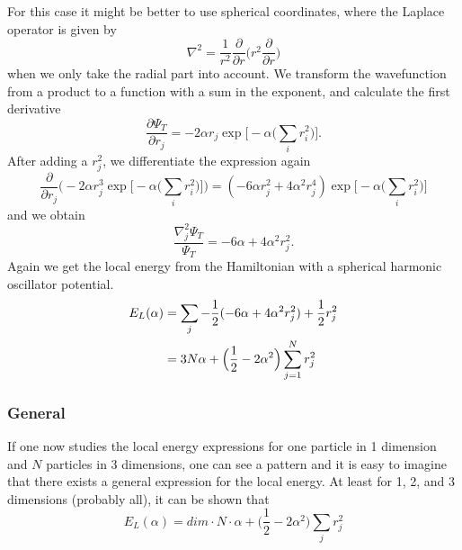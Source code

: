 \documentclass[norsk,a4paper,12pt]{article}
\begin{document}
For this case it might be better to use spherical coordinates, where the Laplace operator is given by
\begin{equation}
\nabla^2=\frac{1}{r^2}\frac{\partial}{\partial r}\bigg(r^2\frac{\partial}{\partial r}\bigg)
\end{equation}
when we only take the radial part into account. We transform the wavefunction from a product to a function with a sum in the exponent, and calculate the first derivative
\begin{equation}
\frac{\partial\Psi_T}{\partial r_j}=-2\alpha r_j \exp\bigg[-\alpha\bigg(\sum_i r_i^2\bigg)\bigg].
\end{equation}
After adding a $r_j^2$, we differentiate the expression again
\begin{equation*}
\frac{\partial}{\partial r_j}\bigg(-2\alpha r_j^3\exp\Big[-\alpha\Big(\sum_i r_i^2\Big)\Big]\bigg)
=(-6\alpha r_j^2 + 4\alpha^2r_j^4)\exp\Big[-\alpha\Big(\sum_i r_i^2\Big)\Big]
\end{equation*}
and we obtain
\begin{equation}
\frac{\nabla_j^2\Psi_T}{\Psi_T}=-6\alpha+4\alpha^2r_j^2.
\end{equation}
Again we get the local energy from the Hamiltonian with a spherical harmonic oscillator potential. 
\begin{align}
E_L(\alpha)&=\sum_j-\frac{1}{2}(-6\alpha+4\alpha^2r_j^2) + \frac{1}{2}r_j^2\notag\\
&=3N\alpha + \Big(\frac{1}{2}-2\alpha^2\Big)\sum_{j=1}^Nr_j^2
\end{align}

\subsubsection{General}
If one now studies the local energy expressions for one particle in 1 dimension and $N$ particles in 3 dimensions, one can see a pattern and it is easy to imagine that there exists a general expression for the local energy. At least for 1, 2, and 3 dimensions (probably all), it can be shown that
\begin{equation}
E_L(\alpha)=dim\cdot N\cdot \alpha+\Big(\frac{1}{2}-2\alpha^2\Big)\sum_jr_j^2
\end{equation}
\end{document}
